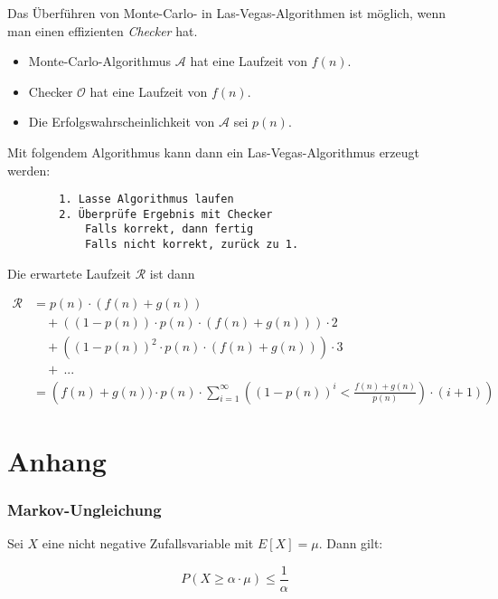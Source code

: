 \documentclass{scrartcl}%
\begin{document}
    Das Überführen von Monte-Carlo- in Las-Vegas-Algorithmen ist möglich, wenn man einen effizienten \textit{Checker} hat.

    \begin{itemize}
        \item Monte-Carlo-Algorithmus $\mathcal{A}$ hat eine Laufzeit von $f(n)$.
        \item Checker $\mathcal{O}$ hat eine Laufzeit von $f(n)$.
        \item Die Erfolgswahrscheinlichkeit von $\mathcal{A}$ sei $p(n)$.
    \end{itemize}

    Mit folgendem Algorithmus kann dann ein Las-Vegas-Algorithmus erzeugt werden:

    \begin{lstlisting}
        1. Lasse Algorithmus laufen
        2. Überprüfe Ergebnis mit Checker
            Falls korrekt, dann fertig
            Falls nicht korrekt, zurück zu 1.
    \end{lstlisting}

    Die erwartete Laufzeit $\mathcal{R}$ ist dann

    \begin{equation*}
        \begin{flalign}
            \mathcal{R} &= p(n) \cdot (f(n) + g(n))&&\\\nonumber
                        &\quad + ((1 - p(n)) \cdot p(n) \cdot (f(n) + g(n))) \cdot 2&&\\\nonumber
                        &\quad + ((1 - p(n))^2 \cdot p(n) \cdot (f(n) + g(n))) \cdot 3&&\\\nonumber
                        &\quad +\ ...&&\\\nonumber
                        &=\left( f(n) + g(n)) \cdot p(n) \cdot \sum^{\infty}_{i=1}((1-p(n))^i < \frac{f(n) + g(n)}{p(n)}) \cdot (i+1)\right)
        \end{flalign}
    \end{equation*}

    \hrulefill

    \section*{Anhang}
    \label{sec:anhang}

    \subsubsection*{Markov-Ungleichung}
    Sei $X$ eine nicht negative Zufallsvariable mit $E[X] = \mu$.
    Dann gilt:

    \begin{equation*}
        P(X \geq \alpha \cdot \mu ) \leq \frac{1}{\alpha}
    \end{equation*}
\end{document}
